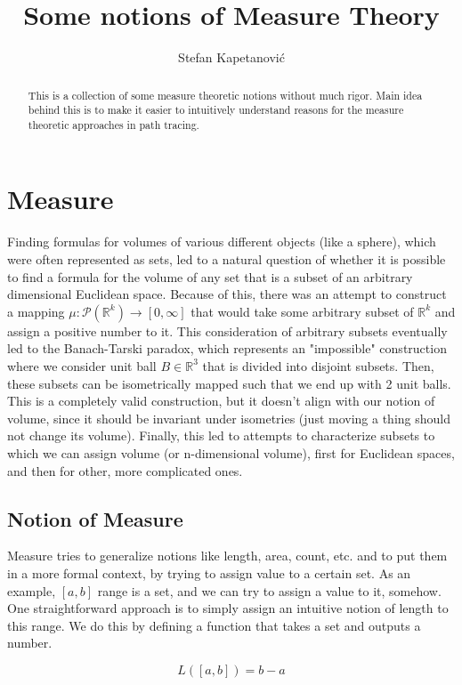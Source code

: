 \documentclass{article}
\title{Some notions of Measure Theory}
\author{Stefan Kapetanović}
\begin{document}
\maketitle

\begin{abstract}
This is a collection of some measure theoretic notions without much rigor. Main idea behind this is to make it easier to intuitively understand reasons for the measure theoretic approaches in path tracing.
\end{abstract}

\section{Measure}
Finding formulas for volumes of various different objects (like a sphere), which were often represented as sets, led to a natural question of whether it is possible to find a formula for the volume of any set that is a subset of an arbitrary dimensional Euclidean space. Because of this, there was an attempt to construct a mapping $\mu:\mathcal{P}(\mathbb{R}^k)\to[0,\infty]$ that would take some arbitrary subset of $\mathbb{R}^k$ and assign a positive number to it. This consideration of arbitrary subsets eventually led to the Banach-Tarski paradox, which represents an "impossible" construction where we consider unit ball $B\in\mathbb{R}^3$ that is divided into disjoint subsets. Then, these subsets can be isometrically mapped such that we end up with 2 unit balls. This is a completely valid construction, but it doesn't align with our notion of volume, since it should be invariant under isometries (just moving a thing should not change its volume). Finally, this led to attempts to characterize subsets to which we can assign volume (or n-dimensional volume), first for Euclidean spaces, and then for other, more complicated ones.

\subsection{Notion of Measure}
Measure tries to generalize notions like length, area, count, etc. and to put them in a more formal context, by trying to assign value to a certain set. As an example, $[a, b]$ range is a set, and we can try to assign a value to it, somehow. One straightforward approach is to simply assign an intuitive notion of length to this range. We do this by defining a function that takes a set and outputs a number.

\[ L([a, b]) = b - a \]
\end{document}

